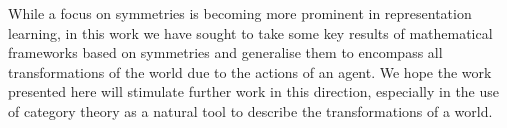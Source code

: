 While a focus on symmetries is becoming more prominent in representation learning, in this work we have sought to take some key results of mathematical frameworks based on symmetries and generalise them to encompass all transformations of the world due to the actions of an agent.
We hope the work presented here will stimulate further work in this direction, especially in the use of category theory as a natural tool to describe the transformations of a world.


% 
